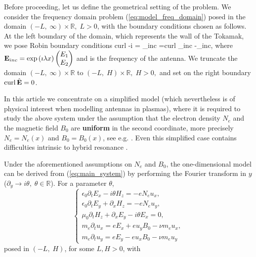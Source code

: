 {Before proceeding, let us define the geometrical setting of the problem. We consider the frequency domain problem (\ref{eq:model_freq_domain}) posed in the domain $(-L,\;\infty)\times\mathbb{R},\; L>0$, with the 
 boundary conditions chosen as follows. At the left boundary of the domain, which represents the wall of the Tokamak, we pose Robin boundary conditions 
\be
\label{eq:boundary_conditions_intro}
curl  -i \lambda{}\wedge \n = _{inc} =curl \E_{inc} -\imath\lambda\E_{inc}\wedge \n,
\ee
where ${\bf E}_{inc} = \exp \left(\imath \lambda x\right)\begin{pmatrix} E_1\\ E_2 \end{pmatrix}$ and  is 
the frequency of the antenna. We truncate the domain 
$(-L,\; \infty)\times\mathbb{R}$ to $(-L,\; H)\times\mathbb{R},\; H>0,$ and set on the right boundary $\operatorname{curl} \hat{{\bf E}} = 0$. 

In this article we concentrate on a simplified model (which nevertheless is of physical interest when modelling antennas in plasmas), 
where it is required to study the above system under the assumption that the electron density $N_{e}$ and the magnetic field $B_0$ are \textbf{uniform} in the second coordinate, more precisely 
$N_{e}=N_{e}(x)$ and $B_0=B_0(x)$, see e.g. \cite{Despres_2014}. Even this simplified case contains difficulties intrinsic to hybrid resonance \cite{Despres_2014, singular_solutions}. 

Under the aforementioned assumptions on $N_e$ and $B_0$, the one-dimensional model can be derived from (\ref{eq:main_system}) by performing the Fourier transform in $y$ ($\partial_y\rightarrow i\theta, \; \theta\in\mathbb{R}$). For a parameter $\theta$,
\begin{equation}
 \label{eq:main_model}
\begin{cases}
\epsilon_0\partial_t E_{x}-i\theta H_z=-eN_e u_x,\\
\epsilon_0\partial_t E_{y}+\partial_x H_z=-eN_e u_y,\\
\mu_0\partial_t H_z+\partial_x E_y-i\theta E_x =0,\\
m_e\partial_t u_x=eE_x+eu_yB_0-\nu m_e u_x,\\
m_e\partial_t u_y=eE_y-eu_xB_0-\nu m_e u_y
\end{cases}
\end{equation}
 posed in $(-L,\; H)$, for some $L,H>0$, with 

}
